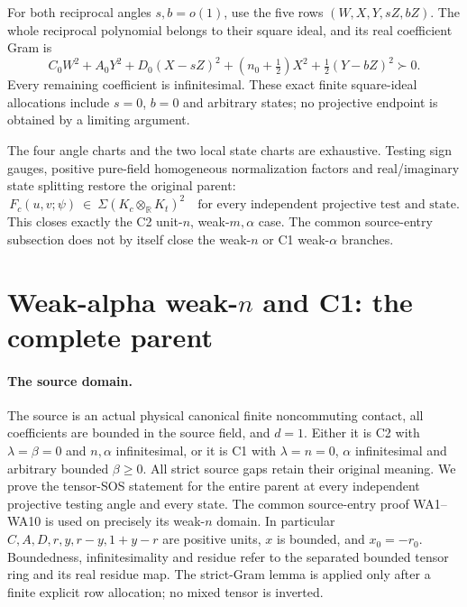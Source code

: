 For both reciprocal angles \(s,b=o(1)\), use the five rows
\((W,X,Y,sZ,bZ)\). The whole reciprocal polynomial belongs
to their square ideal, and its real coefficient Gram is
\[
 C_0W^2+A_0Y^2+D_0(X-sZ)^2
          +(n_0+\tfrac12)X^2+\tfrac12(Y-bZ)^2\succ0 .
 \tag{WA26}
\]
Every remaining coefficient is infinitesimal. These exact finite
square-ideal allocations include \(s=0\), \(b=0\) and arbitrary
states; no projective endpoint is obtained by a limiting argument.

The four angle charts and the two local state charts are exhaustive.
Testing sign gauges, positive pure-field homogeneous normalization
factors and real/imaginary state splitting restore the original parent:
\[
 F_c(u,v;\psi)\ \in\ \Sigma(K_c\otimes_{\mathbb R}K_t)^2
 \quad\text{for every independent projective test and state.}
 \tag{WA27}
\]
This closes exactly the C2 unit-\(n\), weak-\(m,\alpha\) case.
The common source-entry subsection does not by itself close the
weak-\(n\) or C1 weak-\(\alpha\) branches.



\section{\texorpdfstring{Weak-alpha weak-\(n\) and C1: the complete parent}{Weak-alpha weak-n and C1: the complete parent}}
\label{component:p0db05df21ad1}

\label{p0db05df21ad1:sec:weak-alpha-weak-n-c1}

\paragraph{The source domain.}
The source is an actual physical canonical finite noncommuting contact,
all coefficients are bounded in the source field, and \(d=1\).
Either it is C2 with \(\lambda=\beta=0\) and \(n,\alpha\) infinitesimal,
or it is C1 with \(\lambda=n=0\), \(\alpha\) infinitesimal and arbitrary
bounded \(\beta\geq0\). All strict source gaps retain their original
meaning. We prove the tensor-SOS statement for the entire parent at
every independent projective testing angle and every state.
The common source-entry proof WA1--WA10 is used on precisely its
weak-\(n\) domain. In particular \(C,A,D,r,y,r-y,1+y-r\) are positive
units, \(x\) is bounded, and \(x_0=-r_0\).
Boundedness, infinitesimality and residue refer
to the separated bounded tensor ring and its real residue map.
The strict-Gram lemma is applied only after a finite explicit row
allocation; no mixed tensor is inverted.


